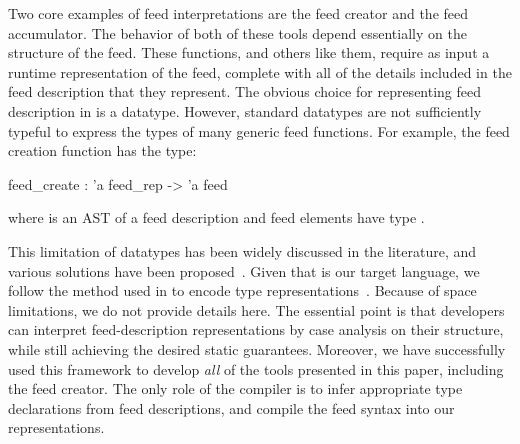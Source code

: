 Two core examples of feed interpretations are the feed creator and the feed accumulator. The behavior of both of these tools depend essentially on the structure of the feed. These functions, and others like them, require as input a runtime representation of the feed, complete with all of the details included in the feed description that they represent. The obvious choice for representing feed description in \ocaml is a datatype. However, standard \ocaml datatypes are not sufficiently typeful to express the types of many generic feed functions. For example, the feed creation function has the type: 
\begin{code}
feed_create : 'a feed_rep -> 'a feed
\end{code} where  is an AST of a feed description and feed elements have type .


This limitation of datatypes has been widely discussed in the literature, and various solutions have been proposed~\cite{various, our-padl-paper}. Given that \ocaml is our target language, we follow the method used in \padsml{} to encode type representations~\cite{padsml-padl}. Because of space limitations, we do not provide details here.  The essential point is that developers can interpret feed-description representations by case analysis on their structure, while still achieving the desired static guarantees. Moreover, we have successfully used this framework to develop {\it all} of the tools presented in this paper, including the feed creator. The only role of the compiler is to infer appropriate type declarations from feed descriptions, and compile the feed syntax into our representations.

